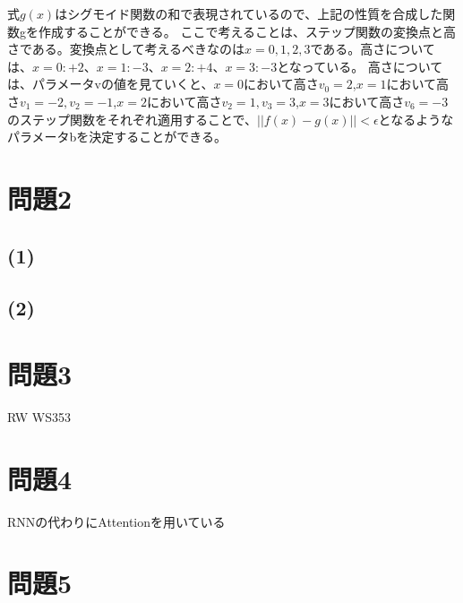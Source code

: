 \documentclass[a4j,11pt]{jarticle}
\begin{document}
式$g(x)$はシグモイド関数の和で表現されているので、上記の性質を合成した関数gを作成することができる。
ここで考えることは、ステップ関数の変換点と高さである。変換点として考えるべきなのは$x = 0,1,2,3$である。高さについては、$x=0:+2$、$x=1:-3$、$x=2:+4$、$x=3:-3$となっている。
高さについては、パラメータvの値を見ていくと、$x=0$において高さ$v_0 = 2$,$x=1$において高さ$v_1 = -2,v_2 = -1$,$x=2$において高さ$v_2 = 1,v_3 = 3$,$x=3$において高さ$v_6 = -3$のステップ関数をそれぞれ適用することで、$||f(x) - g(x)|| < \epsilon$となるようなパラメータbを決定することができる。

\newpage
\section{問題2}

\subsection*{(1)}

\subsection*{(2)}

\newpage
\section{問題3}
RW
WS353


\newpage
\section{問題4}
RNNの代わりにAttentionを用いている

\newpage
\section{問題5}
\end{document}
